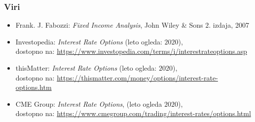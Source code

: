 \documentclass[14pt]{beamer}
\begin{document}
\begin{frame}
    \frametitle{Viri}
    \begin{itemize} 
        \item Frank. J. Fabozzi: \textit{Fixed Income Analysis}, John Wiley \& Sons $2$. izdaja, 2007
        \item Investopedia: \textit{Interest Rate Options} (leto ogleda: $2020$), \\
                dostopno na: \url{https://www.investopedia.com/terms/i/interestrateoptions.asp}
        \item thisMatter: \textit{Interest Rate Options} (leto ogleda: $2020$), \\
                dostopno na: \url{https://thismatter.com/money/options/interest-rate-options.htm}
    \end{itemize}
\end{frame}
\begin{frame}
    \begin{itemize}
        \item CME Group: \textit{Interest Rate Options}, (leto ogleda $2020$), \\
        dostopno na: \url{https://www.cmegroup.com/trading/interest-rates/options.html}
    \end{itemize}
\end{frame}
\end{document}
